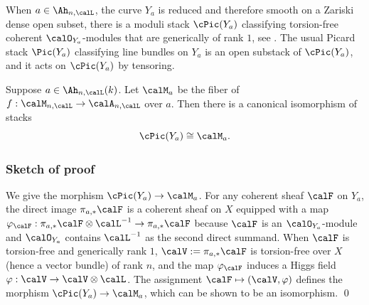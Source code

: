 When $a\in\Ah_{n,\calL}$,  the curve $Y_{a}$ is reduced and therefore smooth on a Zariski dense open subset, there is a moduli stack $\cPic(Y_{a})$ classifying torsion-free coherent $\calO_{Y_{a}}$-modules that are generically of rank $1$, see \cite{AK}. The usual Picard stack $\Pic(Y_{a})$ classifying line bundles on $Y_{a}$ is an open substack of $\cPic(Y_{a})$, and it acts on $\cPic(Y_{a})$ by tensoring.


\begin{prop}\label{p:cPic}  Suppose $a\in\Ah_{n,\calL}(k)$. Let $\calM_{a}$ be the fiber of $f:\calM_{n,\calL}\to \calA_{n,\calL}$ over $a$. Then there is a canonical isomorphism of stacks
\begin{equation*}
\cPic(Y_{a})\cong\calM_{a}.
\end{equation*}
\end{prop}

\subsubsection{Sketch of proof}\label{sss:pf cPic}
We give the morphism $\cPic(Y_{a})\to \calM_{a}$. For any coherent sheaf $\calF$ on $Y_{a}$, the direct image $\pi_{a,*}\calF$ is a coherent sheaf on $X$ equipped with a map $\varphi_{\calF}: \pi_{a,*}\calF\otimes\calL^{-1}\to\pi_{a,*}\calF$ because $\calF$ is an $\calO_{Y_{a}}$-module and $\calO_{Y_{a}}$ contains $\calL^{-1}$ as the second direct summand. When $\calF$ is torsion-free and generically rank $1$, $\calV:=\pi_{a,*}\calF$ is torsion-free over $X$ (hence a vector bundle) of rank $n$, and the map $\varphi_{\calF}$ induces a Higgs field $\varphi:\calV\to\calV\otimes\calL$. The assignment $\calF\mapsto (\calV,\varphi)$ defines the morphism $\cPic(Y_{a})\to \calM_{a}$, which can be shown to be an isomorphism. \qed




